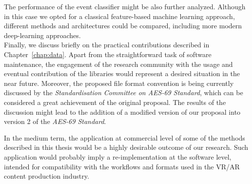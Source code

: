 The performance of the event classifier might be also further analyzed. Although in this case we opted for a classical feature-based machine learning approach, different methods and architectures could be compared, including more modern deep-learning approaches.\\


Finally, we discuss briefly on the practical contributions described in  Chapter~\ref{chap:data}.
Apart from the straightforward task of software maintenance, the engagement of the research community with the usage and eventual contribution of the libraries would represent a desired situation in the near future.
Moreover, the proposed file format convention is being currently discussed by the \textit{Standardisation Committee on AES-69 Standard}, which can be considered a great achievement of the original proposal. 
The results of the discussion might lead to the addition of a modified version of our proposal into version 2 of the \textit{AES-69 Standard}. 


In the medium term, the application at commercial level of some of the methods  described in this thesis would be a highly desirable outcome of our research. Such application would probably imply a re-implementation at the software level, intended for compatibility with the workflows and formats used in the VR/AR content production industry. 

